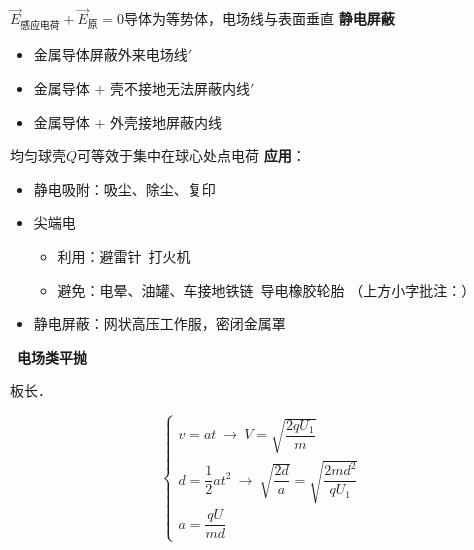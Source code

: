 $\vec{E}_{\text{感应电荷}}+\vec{E}_{\text{原}}=0$\qquad 导体为等势体，电场线与表面垂直
\textbf{静电屏蔽}
\begin{itemize}
\item 金属导体\quad 屏蔽外来电场线$'$
\item 金属导体 $+$ 壳不接地\quad 无法屏蔽内线$'$
\item 金属导体 $+$ 外壳接地\quad 屏蔽内线
\end{itemize}
均匀球壳$Q$可等效于集中在球心处点电荷
\textbf{应用}：
\begin{itemize}
\item 静电吸附：吸尘、除尘、复印
\item 尖端电 %
\begin{itemize}
\item 利用：避雷针\ 打火机
\item 避免：电晕、油罐、车接地铁链\ 导电橡胶轮胎
（上方小字批注：）
\end{itemize}
\item 静电屏蔽：网状高压工作服，密闭金属罩
\end{itemize}
\ \textbf{电场类平抛}


板长．

\[
\begin{cases}
v=at\ \to\ V=\sqrt{\dfrac{2qU_1}{m}}\\[6pt]
d=\dfrac{1}{2}at^{2}\ \to\ \sqrt{\dfrac{2d}{a}}=\sqrt{\dfrac{2md^{2}}{qU_1}}\\[6pt]
a=\dfrac{qU}{md}
\end{cases}
\]

